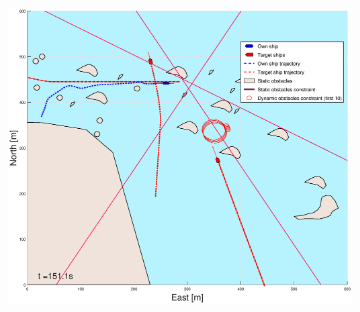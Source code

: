 \begin{figure}[ht]\ContinuedFloat
    \begin{subfigure}[b]{0.494\textwidth}
        \centering
        \includegraphics[width=\textwidth]{Images/Figures/skjergard_m_trafikk_NEW/_Simple_1fig1_time=151}

\end{subfigure}
\end{figure}
